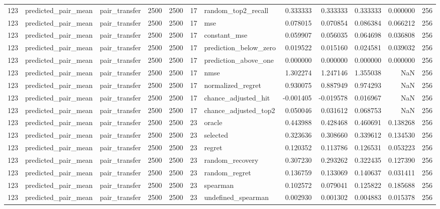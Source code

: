 \begin{tabular}{rllrrrlrrrrr}
123 & predicted_pair_mean & pair_transfer & 2500 & 2500 & 17 & random_top2_recall & 0.333333 & 0.333333 & 0.333333 & 0.000000 & 256 \\
123 & predicted_pair_mean & pair_transfer & 2500 & 2500 & 17 & mse & 0.078015 & 0.070854 & 0.086384 & 0.066212 & 256 \\
123 & predicted_pair_mean & pair_transfer & 2500 & 2500 & 17 & constant_mse & 0.059907 & 0.056035 & 0.064698 & 0.036808 & 256 \\
123 & predicted_pair_mean & pair_transfer & 2500 & 2500 & 17 & prediction_below_zero & 0.019522 & 0.015160 & 0.024581 & 0.039032 & 256 \\
123 & predicted_pair_mean & pair_transfer & 2500 & 2500 & 17 & prediction_above_one & 0.000000 & 0.000000 & 0.000000 & 0.000000 & 256 \\
123 & predicted_pair_mean & pair_transfer & 2500 & 2500 & 17 & nmse & 1.302274 & 1.247146 & 1.355038 & NaN & 256 \\
123 & predicted_pair_mean & pair_transfer & 2500 & 2500 & 17 & normalized_regret & 0.930075 & 0.887949 & 0.974293 & NaN & 256 \\
123 & predicted_pair_mean & pair_transfer & 2500 & 2500 & 17 & chance_adjusted_hit & -0.001405 & -0.019578 & 0.016967 & NaN & 256 \\
123 & predicted_pair_mean & pair_transfer & 2500 & 2500 & 17 & chance_adjusted_top2 & 0.050046 & 0.031612 & 0.068753 & NaN & 256 \\
123 & predicted_pair_mean & pair_transfer & 2500 & 2500 & 23 & oracle & 0.443988 & 0.428468 & 0.460691 & 0.138268 & 256 \\
123 & predicted_pair_mean & pair_transfer & 2500 & 2500 & 23 & selected & 0.323636 & 0.308660 & 0.339612 & 0.134530 & 256 \\
123 & predicted_pair_mean & pair_transfer & 2500 & 2500 & 23 & regret & 0.120352 & 0.113786 & 0.126531 & 0.053223 & 256 \\
123 & predicted_pair_mean & pair_transfer & 2500 & 2500 & 23 & random_recovery & 0.307230 & 0.293262 & 0.322435 & 0.127390 & 256 \\
123 & predicted_pair_mean & pair_transfer & 2500 & 2500 & 23 & random_regret & 0.136759 & 0.133069 & 0.140637 & 0.031411 & 256 \\
123 & predicted_pair_mean & pair_transfer & 2500 & 2500 & 23 & spearman & 0.102572 & 0.079041 & 0.125822 & 0.185688 & 256 \\
123 & predicted_pair_mean & pair_transfer & 2500 & 2500 & 23 & undefined_spearman & 0.002930 & 0.001302 & 0.004883 & 0.015378 & 256 \\

\end{tabular}
